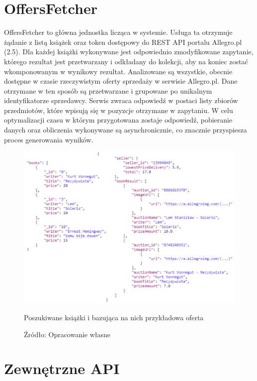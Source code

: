\section{OffersFetcher}
OffersFetcher to główna jednostka licząca w systemie. Usługa ta otrzymuje żądanie z listą książek oraz token dostępowy do REST API portalu Allegro.pl (2.5).
Dla każdej książki wykonywane jest odpowiednio zmodyfikowane zapytanie, którego rezultat jest przetwarzany i odkładany do kolekcji, aby na koniec zostać wkomponowanym w wynikowy rezultat. Analizowane są wszystkie, obecnie dostępne w czasie rzeczywistym oferty sprzedaży w serwisie Allegro.pl. Dane otrzymane w ten sposób są przetwarzane i grupowane po unikalnym identyfikatorze sprzedawcy. Serwis zwraca odpowiedź w postaci listy zbiorów przedmiotów, które wpisują się w pozyzcje otrzymane w zapytaniu. W celu optymalizacji czasu w którym przygotowana zostaje odpowiedź, pobieranie danych oraz obliczenia wykonywane są asynchronicznie, co znacznie przyspiesza proces generowania wyników.
\begin{figure}[H]
	\centering
	\includegraphics[width=\linewidth]{booksToOffers.pdf}
	\caption{\centering Poszukiwane książki i bazująca na nich przykładowa oferta}
	\caption*{\centering Źródło: {Opracowanie własne}}
\end{figure}

\section{Zewnętrzne API}

